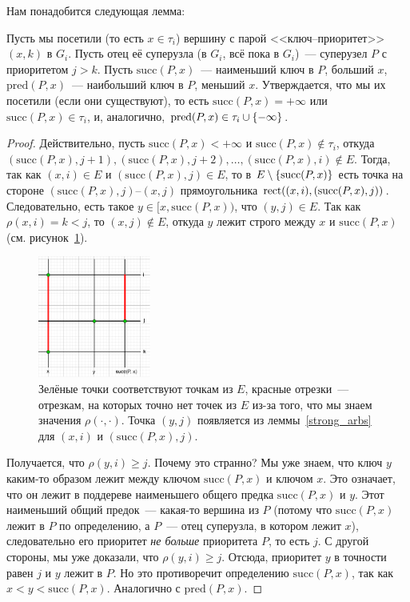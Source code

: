 Нам понадобится следующая лемма:

\begin{lemma}\label{visited_parent}
	Пусть мы посетили (то есть $x \in \tau_i$) вершину с парой <<ключ--приоритет>> $(x, k)$ в $G_i$. Пусть отец её суперузла (в $G_i$, всё пока в $G_i$)~--- суперузел $P$ с приоритетом $j > k$.
	Пусть $\mathrm{succ}(P, x)$~--- наименьший ключ в $P$, больший $x$, $\mathrm{pred}(P, x)$~--- наибольший ключ в $P$, меньший $x$.
	Утверждается, что мы их посетили (если они существуют), то есть $\mathrm{succ}(P, x) = +\infty$ или $\mathrm{succ}(P, x) \in \tau_i$, и, аналогично, $\mathrm{pred}(P, x) \in \tau_i \cup \lbrace-\infty\rbrace$.
\end{lemma}
\begin{proof}
	Действительно, пусть $\mathrm{succ}(P, x) < +\infty$ и $\mathrm{succ}(P, x) \notin \tau_i$, откуда $(\mathrm{succ}(P, x), j + 1), (\mathrm{succ}(P, x), j + 2), \ldots, (\mathrm{succ}(P, x), i) \notin E$. Тогда, так как $(x, i) \in E$ и $(\mathrm{succ}(P, x), j) \in E$, то в $E \setminus \lbrace\mathrm{succ}(P, x)\rbrace$ есть точка на стороне $(\mathrm{succ}(P, x), j)$--$(x,j)$ прямоугольника $\operatorname{rect}((x, i), (\mathrm{succ}(P, x), j))$. Следовательно, есть такое $y \in [x, \mathrm{succ}(P, x))$, что $(y, j) \in E$. Так как $\rho(x, i) = k < j$, то $(x, j) \notin E$, откуда $y$ лежит строго между $x$ и $\mathrm{succ}(P, x)$ (см. рисунок~\ref{proof_diagram}).

	\begin{figure}
		\includegraphics[height=4cm]{img/lemma_proof_diagram.png}

		\caption{Зелёные точки соответствуют точкам из $E$, красные отрезки~--- отрезкам, на которых точно нет точек из $E$ из-за того, что мы знаем значения
			$\rho(\cdot, \cdot)$. Точка $(y, j)$ появляется из леммы~\ref{strong_arbs} для $(x, i)$ и
			$(\mathrm{succ}(P, x), j)$.}
		\label{proof_diagram}
	\end{figure}

	Получается, что $\rho(y, i) \geqslant j$. Почему это странно? Мы уже знаем, что ключ $y$ каким-то образом лежит между ключом $\mathrm{succ}(P, x)$ и ключом $x$. Это означает, что он лежит в поддереве наименьшего общего предка
	$\mathrm{succ}(P, x)$ и $y$. Этот наименьший общий предок~--- какая-то вершина из $P$ (потому что $\mathrm{succ}(P, x)$ лежит в $P$ по определению, а $P$~--- отец суперузла, в котором лежит $x$), следовательно его приоритет \emph{не больше} приоритета $P$, то есть $j$. С другой стороны, мы уже доказали, что $\rho(y, i) \geqslant j$. Отсюда, приоритет $y$ в точности равен $j$ и $y$ лежит в $P$. Но это противоречит определению $\mathrm{succ}(P, x)$, так как $x < y < \mathrm{succ}(P, x)$. Аналогично с $\mathrm{pred}(P, x)$.

\end{proof}

